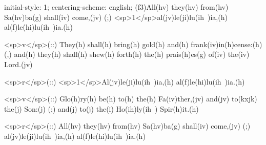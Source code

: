 initial-style: 1;
centering-scheme: english;
(f3)All(hv) they(hv) from(hv) Sa(hv)ba(g) shall(iv) come,(jv) (;) <sp>1</sp>al(jv)le(ji)lu(ih~)ia,(h) al(f)le(hi)lu(ih~)ia.(h)

<sp>v</sp>(::) They(h) shall(h) bring(h) gold(h) and(h) frank(iv)in(h)cense:(h) (,) and(h) they(h) shall(h) shew(h) forth(h) the(h) prais(h)es(g) of(iv) the(iv) Lord.(jv)

<sp>r</sp>(::) <sp>1</sp>Al(jv)le(ji)lu(ih~)ia,(h) al(f)le(hi)lu(ih~)ia.(h)

<sp>v</sp>(::) Glo(h)ry(h) be(h) to(h) the(h) Fa(iv)ther,(jv) and(jv) to(kxjk) the(j) Son:(j) (;) and(j) to(j) the(i) Ho(ih)ly(ih~) Spir(h)it.(h)

<sp>r</sp>(::) All(hv) they(hv) from(hv) Sa(hv)ba(g) shall(iv) come,(jv) (;) al(jv)le(ji)lu(ih~)ia,(h) al(f)le(hi)lu(ih~)ia.(h)